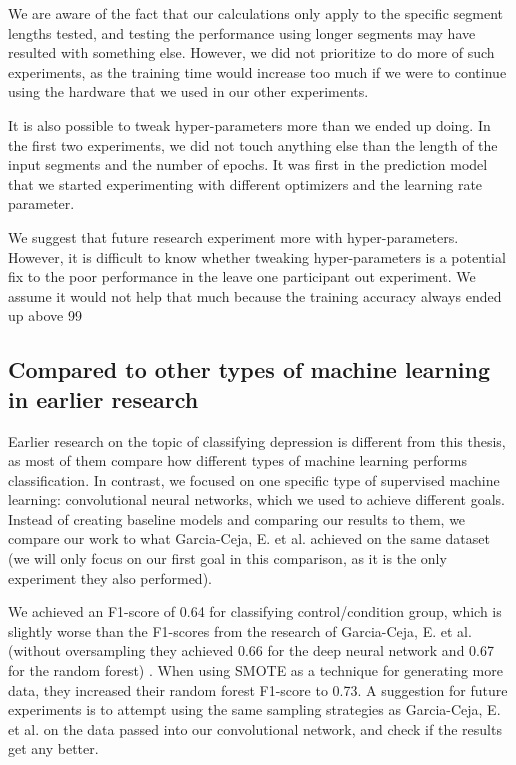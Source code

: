 We are aware of the fact that our calculations only apply to the specific segment lengths tested, and testing the performance using longer segments may have resulted with something else. However, we did not prioritize to do more of such experiments, as the training time would increase too much if we were to continue using the hardware that we used in our other experiments. 

It is also possible to tweak hyper-parameters more than we ended up doing. In the first two experiments, we did not touch anything else than the length of the input segments and the number of epochs. It was first in the prediction model that we started experimenting with different optimizers and the learning rate parameter. 

We suggest that future research experiment more with hyper-parameters. However, it is difficult to know whether tweaking hyper-parameters is a potential fix to the poor performance in the leave one participant out experiment. We assume it would not help that much because the training accuracy always ended up above 99%

\subsection{Compared to other types of machine learning in earlier research}
Earlier research on the topic of classifying depression is different from this thesis, as most of them compare how different types of machine learning performs classification. In contrast, we focused on one specific type of supervised machine learning: convolutional neural networks, which we used to achieve different goals. Instead of creating baseline models and comparing our results to them, we compare our work to what Garcia-Ceja, E. et al. achieved on the same dataset (we will only focus on our first goal in this comparison, as it is the only experiment they also performed). 

We achieved an F1-score of 0.64 for classifying control/condition group, which is slightly worse than the F1-scores from the research of Garcia-Ceja, E. et al. (without oversampling they achieved 0.66 for the deep neural network and 0.67 for the random forest) \cite{GarciaCeja2018_classification_bipolar}. When using SMOTE as a technique for generating more data, they increased their random forest F1-score to 0.73. A suggestion for future experiments is to attempt using the same sampling strategies as Garcia-Ceja, E. et al. on the data passed into our convolutional network, and check if the results get any better. 

